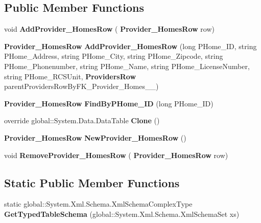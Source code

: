 \subsection*{Public Member Functions}
\begin{DoxyCompactItemize}
\item 
\mbox{\label{class_a_f_h___scheduler_1_1_home_inspection_data_set_1_1_provider___homes_data_table_a29443b0c082f76a80b3ab628a8f34f05}} 
void {\bfseries Add\+Provider\+\_\+\+Homes\+Row} (\textbf{ Provider\+\_\+\+Homes\+Row} row)
\item 
\mbox{\label{class_a_f_h___scheduler_1_1_home_inspection_data_set_1_1_provider___homes_data_table_ab00757ddb6f1771f80819e118f9e116a}} 
\textbf{ Provider\+\_\+\+Homes\+Row} {\bfseries Add\+Provider\+\_\+\+Homes\+Row} (long P\+Home\+\_\+\+ID, string P\+Home\+\_\+\+Address, string P\+Home\+\_\+\+City, string P\+Home\+\_\+\+Zipcode, string P\+Home\+\_\+\+Phonenumber, string P\+Home\+\_\+\+Name, string P\+Home\+\_\+\+License\+Number, string P\+Home\+\_\+\+R\+C\+S\+Unit, \textbf{ Providers\+Row} parent\+Providers\+Row\+By\+F\+K\+\_\+\+Provider\+\_\+\+Homes\+\_\+\_)
\item 
\mbox{\label{class_a_f_h___scheduler_1_1_home_inspection_data_set_1_1_provider___homes_data_table_a7f486e6940dbfaea69affd2d4fa7aaf6}} 
\textbf{ Provider\+\_\+\+Homes\+Row} {\bfseries Find\+By\+P\+Home\+\_\+\+ID} (long P\+Home\+\_\+\+ID)
\item 
\mbox{\label{class_a_f_h___scheduler_1_1_home_inspection_data_set_1_1_provider___homes_data_table_afcb1ef95bb62817ecf5c0fd8464a2478}} 
override global\+::\+System.\+Data.\+Data\+Table {\bfseries Clone} ()
\item 
\mbox{\label{class_a_f_h___scheduler_1_1_home_inspection_data_set_1_1_provider___homes_data_table_a27e6b28ee24dc5bdae359d9043c5765d}} 
\textbf{ Provider\+\_\+\+Homes\+Row} {\bfseries New\+Provider\+\_\+\+Homes\+Row} ()
\item 
\mbox{\label{class_a_f_h___scheduler_1_1_home_inspection_data_set_1_1_provider___homes_data_table_ad0a94efc020d66162c86adbf1401b4f8}} 
void {\bfseries Remove\+Provider\+\_\+\+Homes\+Row} (\textbf{ Provider\+\_\+\+Homes\+Row} row)
\end{DoxyCompactItemize}
\subsection*{Static Public Member Functions}
\begin{DoxyCompactItemize}
\item 
\mbox{\label{class_a_f_h___scheduler_1_1_home_inspection_data_set_1_1_provider___homes_data_table_ae666969905fd9825add1454075566473}} 
static global\+::\+System.\+Xml.\+Schema.\+Xml\+Schema\+Complex\+Type {\bfseries Get\+Typed\+Table\+Schema} (global\+::\+System.\+Xml.\+Schema.\+Xml\+Schema\+Set xs)
\end{DoxyCompactItemize}
